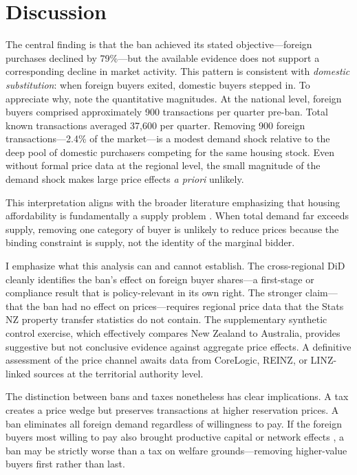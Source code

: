 \documentclass[12pt]{article}
\begin{document}
\section{Discussion}

The central finding is that the ban achieved its stated objective---foreign purchases declined by 79\%---but the available evidence does not support a corresponding decline in market activity. This pattern is consistent with \emph{domestic substitution}: when foreign buyers exited, domestic buyers stepped in. To appreciate why, note the quantitative magnitudes. At the national level, foreign buyers comprised approximately 900 transactions per quarter pre-ban. Total known transactions averaged 37,600 per quarter. Removing 900 foreign transactions---2.4\% of the market---is a modest demand shock relative to the deep pool of domestic purchasers competing for the same housing stock. Even without formal price data at the regional level, the small magnitude of the demand shock makes large price effects \emph{a priori} unlikely.

This interpretation aligns with the broader literature emphasizing that housing affordability is fundamentally a supply problem \citep{glaeser2005housing,saiz2010geographic,hilber2016impact}. When total demand far exceeds supply, removing one category of buyer is unlikely to reduce prices because the binding constraint is supply, not the identity of the marginal bidder.

I emphasize what this analysis can and cannot establish. The cross-regional DiD cleanly identifies the ban's effect on foreign buyer shares---a first-stage or compliance result that is policy-relevant in its own right. The stronger claim---that the ban had no effect on prices---requires regional price data that the Stats NZ property transfer statistics do not contain. The supplementary synthetic control exercise, which effectively compares New Zealand to Australia, provides suggestive but not conclusive evidence against aggregate price effects. A definitive assessment of the price channel awaits data from CoreLogic, REINZ, or LINZ-linked sources at the territorial authority level.

The distinction between bans and taxes nonetheless has clear implications. A tax creates a price wedge but preserves transactions at higher reservation prices. A ban eliminates all foreign demand regardless of willingness to pay. If the foreign buyers most willing to pay also brought productive capital or network effects \citep{burchardi2019migrants}, a ban may be strictly worse than a tax on welfare grounds---removing higher-value buyers first rather than last.
\end{document}
